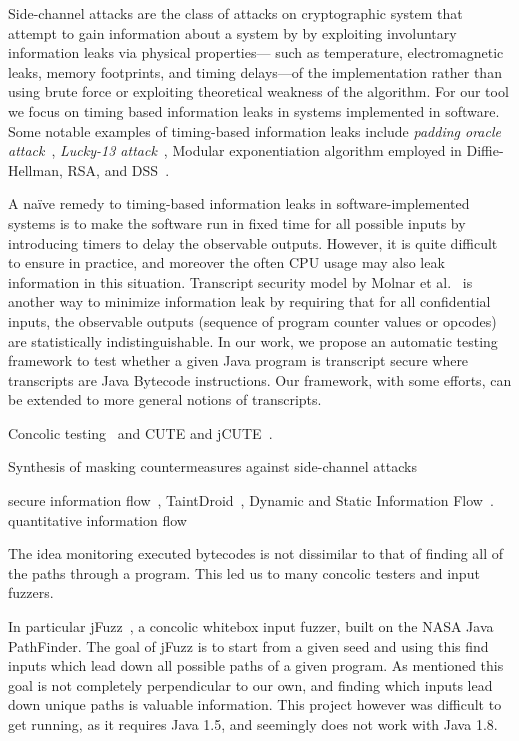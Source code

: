 Side-channel attacks are the class of attacks on cryptographic system that
attempt to gain information about a system by by exploiting involuntary
information leaks via physical properties---
such as temperature, electromagnetic leaks, memory footprints, and timing
delays---of the implementation rather than using brute force or exploiting
theoretical weakness of the algorithm.
For our tool we focus on timing based information leaks in systems
implemented in software. 
Some notable examples of timing-based information leaks include \emph{padding oracle
attack}~\cite{Vau02}, \emph{Lucky-13 attack}~\cite{al2013lucky},  Modular
exponentiation algorithm employed in Diffie-Hellman, RSA, and
DSS~\cite{kocher96}.

A na\"ive remedy to timing-based information leaks in software-implemented
systems is to make the software run in fixed time for all possible inputs by
introducing timers to delay the observable outputs. 
However, it is quite difficult to ensure in practice, and moreover the often CPU
usage may also leak information in this situation. 
Transcript security model by Molnar et al.~\cite{Molnar05} is another way
to minimize information leak by requiring that for all confidential inputs, the
observable outputs (sequence of program counter values or opcodes) are
statistically indistinguishable.
In our work, we propose an automatic testing framework to test whether a given
Java program is transcript secure where transcripts are Java Bytecode
instructions.
Our framework, with some efforts, can be extended to more general notions of
transcripts. 






Concolic testing~\cite{GKS05} and CUTE and jCUTE~\cite{Sen2006}.


Synthesis of masking countermeasures against side-channel attacks~\cite{EW14}


secure information flow~\cite{Den76}, TaintDroid~\cite{Enck14}, Dynamic and
Static Information Flow~\cite{SR10}.
quantitative information flow~\cite{smith09}


The idea monitoring executed bytecodes is not dissimilar to that of finding all
of the paths through a program. This led us to many concolic testers and input
fuzzers.  

In particular jFuzz~\cite{jayaraman2009jfuzz}, a concolic whitebox input fuzzer,
built on the NASA Java PathFinder. The goal of jFuzz is to start from a given
seed and using this find inputs which lead down all possible paths of a given
program. As mentioned this goal is not completely perpendicular to our own, and
finding which inputs lead down unique paths is valuable information. This
project however was difficult to get running, as it requires Java 1.5, and
seemingly does not work with Java 1.8. 

